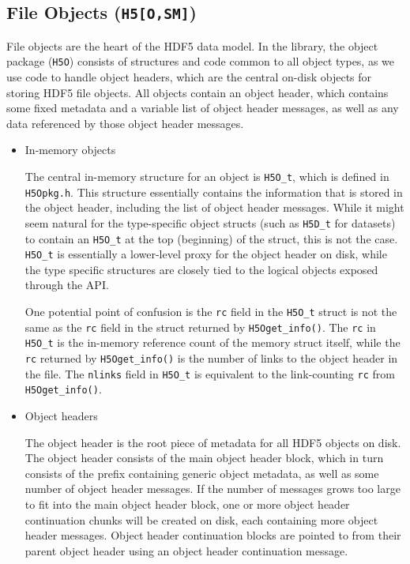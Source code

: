 \subsection{File Objects (\texttt{H5[O,SM]})}


File objects are the heart of the HDF5 data model. In the library, the object package (\texttt{H5O}) consists of structures and code common to all object types, as we use code to handle object headers, which are the central on-disk objects for storing HDF5 file objects. All objects contain an object header, which contains some fixed metadata and a variable list of object header messages, as well as any data referenced by those object header messages.

\begin{itemize}
    \item In-memory objects

The central in-memory structure for an object is \texttt{H5O\_t}, which is defined in \texttt{H5Opkg.h}. This structure essentially contains the information that is stored in the object header, including the list of object header messages. While it might seem natural for the type-specific object structs (such as \texttt{H5D\_t} for datasets) to contain an \texttt{H5O\_t} at the top (beginning) of the struct, this is not the case. \texttt{H5O\_t} is essentially a lower-level proxy for the object header on disk, while the type specific structures are closely tied to the logical objects exposed through the API.

One potential point of confusion is the \texttt{rc} field in the \texttt{H5O\_t} struct is not the same as the \texttt{rc} field in the struct returned by \texttt{H5Oget\_info()}. The \texttt{rc} in \texttt{H5O\_t} is the in-memory reference count of the memory struct itself, while the \texttt{rc} returned by \texttt{H5Oget\_info()} is the number of links to the object header in the file. The \texttt{nlinks} field in \texttt{H5O\_t} is equivalent to the link-counting \texttt{rc} from \texttt{H5Oget\_info()}.

    \item Object headers

The object header is the root piece of metadata for all HDF5 objects on disk. The object header consists of the main object header block, which in turn consists of the prefix containing generic object metadata, as well as some number of object header messages. If the number of messages grows too large to fit into the main object header block, one or more object header continuation chunks will be created on disk, each containing more object header messages. Object header continuation blocks are pointed to from their parent object header using an object header continuation message.


\end{itemize}
